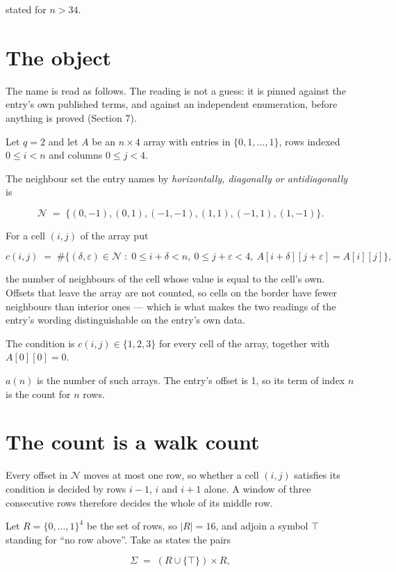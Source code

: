\documentclass[11pt]{article}
\theoremstyle{definition}
\begin{document}
stated for $n > 34$.

\section{The object}

The name is read as follows. The reading is not a guess: it is pinned against the entry's own published terms, and against an independent enumeration, before anything is proved (Section 7).

Let $q = 2$ and let $A$ be an $n \times 4$ array with entries in $\{0,1,\dots,1\}$, rows indexed $0 \le i < n$ and columns $0 \le j < 4$.

The neighbour set the entry names by {\itshape horizontally, diagonally or antidiagonally} is

\[\mathcal{N} \;=\; \{(0,-1), (0,1), (-1,-1), (1,1), (-1,1), (1,-1)\}.\]

For a cell $(i,j)$ of the array put

\[c(i,j) \;=\; \#\bigl\{(\delta,\varepsilon)\in\mathcal{N} \;:\; 0\le i+\delta<n,\ 0\le j+\varepsilon<4,\ A[i+\delta][j+\varepsilon] = A[i][j]\bigr\},\]

the number of neighbours of the cell whose value is equal to the cell's own. Offsets that leave the array are not counted, so cells on the border have fewer neighbours than interior ones --- which is what makes the two readings of the entry's wording distinguishable on the entry's own data.

The condition is $c(i,j) \in \{1, 2, 3\}$ for every cell of the array, together with $A[0][0]=0$.

$a(n)$ is the number of such arrays. The entry's offset is 1, so its term of index $n$ is the count for $n$ rows.

\section{The count is a walk count}

Every offset in $\mathcal{N}$ moves at most one row, so whether a cell $(i,j)$ satisfies its condition is decided by rows $i-1$, $i$ and $i+1$ alone. A window of three consecutive rows therefore decides the whole of its middle row.

Let $R = \{0,\dots,1\}^{4}$ be the set of rows, so $|R| = 16$, and adjoin a symbol $\top$ standing for ``no row above''. Take as states the pairs

\[\Sigma \;=\; (R \cup \{\top\}) \times R,\]
\end{document}
